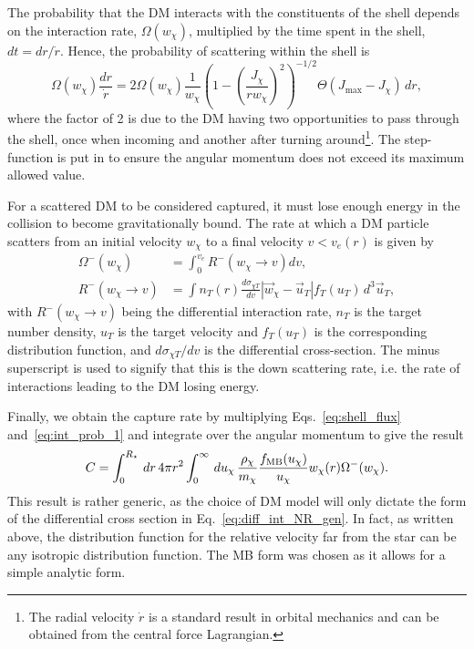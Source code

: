 The probability that the DM interacts with the constituents of the shell depends on the interaction rate, $\Omega(w_\chi)$, multiplied by the time spent in the shell, $dt = dr/\dot r$. Hence, the probability of scattering within the shell is
\begin{equation}
    \Omega(w_\chi) \frac{dr}{\dot r} = 2  \Omega(w_\chi)\frac{1}{w_\chi}\left(1 - \left(\frac{J_\chi}{r w_\chi}\right)^2 \right)^{-1/2} \Theta(J_{\mathrm{max}} - J_\chi)\,dr,\label{eq:int_prob_1}
\end{equation}
where the factor of 2 is due to the DM having two opportunities to pass through the shell, once when incoming and another after turning around\footnote{The radial velocity $\dot r$ is a standard result in orbital mechanics and can be obtained from the central force Lagrangian.}. The step-function is put in to ensure the angular momentum does not exceed its maximum allowed value. 

For a scattered DM to be considered captured, it must lose enough energy in the collision to become gravitationally bound. The rate at which a DM particle scatters from an initial velocity $w_\chi$ to a final velocity $v<v_e(r)$ is given by~\cite{Gould:1987ju_WeaklyInteractingMassive, Gould:1987ir_ResonantEnhancementsWIMP, Busoni:2017mhe_oct_Evaporationscatteringmomentum}
\begin{align}
    \Omega^{-}(w_\chi) &= \int_0^{v_e} R^-(w_\chi \rightarrow v) dv,\label{eq:down_rate_1}\\
    R^-(w_\chi \rightarrow v) & = \int n_T(r) \frac{d\sigma_{\chi T}}{dv} |\vec{w}_\chi -\vec{u}_T| f_T(u_T) \,d^3\vec{u}_T, \label{eq:diff_int_NR_gen}
\end{align}
with $R^-(w_\chi \rightarrow v)$ being the differential interaction rate, $n_T$ is the target number density, $u_T$ is the target velocity and $f_T(u_T)$ is the corresponding distribution function, and $d\sigma_{\chi T}/dv$ is the differential cross-section. The minus superscript is used to signify that this is the down scattering rate, i.e. the rate of interactions leading to the DM losing energy. 

Finally, we obtain the capture rate by multiplying Eqs.~\ref{eq:shell_flux} and~\ref{eq:int_prob_1} and integrate over the angular momentum to give the result
\begin{equation}
    C =\int_0^{R_\star} \,dr\, 4\pi r^2 \int_0^\infty\,du_\chi\, \frac{\rho_\chi}{m_\chi} \frac{f_{\rm MB}(u_\chi)}{u_\chi} w_\chi(r)\Omega^-(w_\chi).
\end{equation}
This result is rather generic, as the choice of DM model will only dictate the form of the differential cross section in  Eq.~\ref{eq:diff_int_NR_gen}. In fact, as written above, the distribution function for the relative velocity far from the star can be any isotropic distribution function. The MB form was chosen as it allows for a simple analytic form. 

